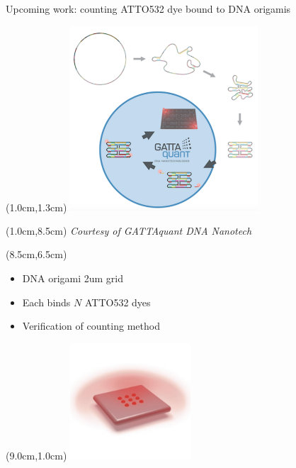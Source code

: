 \documentclass{beamer}					%
\begin{document}
\begin{frame}{Upcoming work: counting ATTO532 dye bound to DNA origamis}
\begin{textblock*}{7cm}(1.0cm,1.3cm)
\includegraphics[width=7cm]{../../spad/spad/media/GATTA2.png}
\end{textblock*}
\begin{textblock*}{8cm}(1.0cm,8.5cm)
\textit{Courtesy of GATTAquant DNA Nanotech}
\end{textblock*}
\begin{textblock*}{7cm}(8.5cm,6.5cm)
\begin{itemize}
\item DNA origami 2um grid
\item Each binds $N$ ATTO532 dyes
\item Verification of counting method
\end{itemize}
\end{textblock*}
\begin{textblock*}{4.5cm}(9.0cm,1.0cm)
\includegraphics[width=4.5cm]{../../spad/spad/media/9R.png}
\end{textblock*}
\end{frame}
\end{document}
